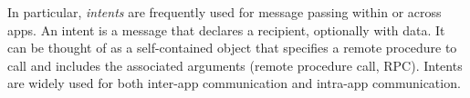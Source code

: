 

In particular, \emph{intents} are frequently used for message passing within or across apps. An intent is a message that declares a recipient, optionally with data. It can be thought of as a self-contained object that specifies a remote procedure to call and includes the associated arguments (remote procedure call, RPC). Intents are widely used for both inter-app communication and intra-app communication.


